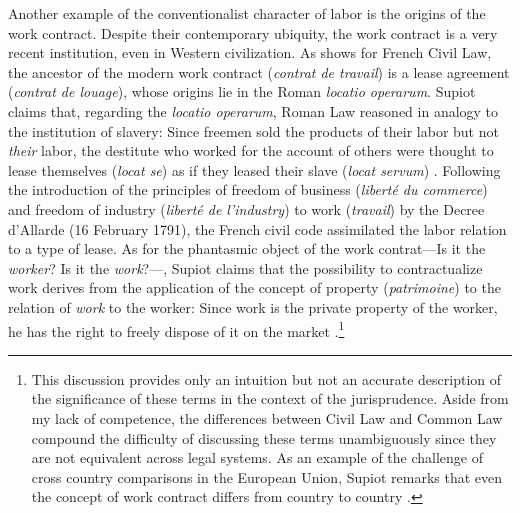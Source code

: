 \documentclass[version=last,draft=false,paper=A4,portrait,twoside=true,twocolumn=false,headinclude=false,footinclude=false,mpinclude=true,fontsize=12,BCOR=20mm,DIV=calc,pagesize=auto,open=right,chapterprefix=true,numbers=autoendperiod,headsepline=false,headings=twolinechapter,parskip=false]{scrbook}
\begin{document}
Another example of the conventionalist character of labor is the origins of
the work contract. Despite their contemporary ubiquity, the work contract
is a very recent institution, even in Western civilization. As
\textcite{supiot2004_2016} shows for French Civil Law, the ancestor of the
modern work contract (\emph{contrat de travail}) is a lease agreement (\emph{contrat de
louage}), whose origins lie in the Roman \emph{locatio operarum}. Supiot claims
that, regarding the \emph{locatio operarum}, Roman Law reasoned in analogy to the
institution of slavery: Since freemen sold the products of their labor but
not \emph{their} labor, the destitute who worked for the account of others were
thought to lease themselves (\emph{locat se}) as if they leased their slave (\emph{locat
servum}) \autocite[p. 8]{supiot2004_2016}. Following the introduction of
the principles of freedom of business (\emph{liberté du commerce}) and freedom of
industry (\emph{liberté de l'industry}) to work (\emph{travail}) by the Decree d'Allarde
(16 February 1791), the French civil code assimilated the labor relation to
a type of lease. As for the phantasmic object of the work contrat---Is it
the \emph{worker}? Is it the \emph{work}?---, Supiot claims that the possibility to
contractualize work derives from the application of the concept of property
(\emph{patrimoine}) to the relation of \emph{work} to the worker: Since work is the
private property of the worker, he has the right to freely dispose of it on
the market \autocite[pp. 45--66]{supiot1994_2011}.\footnote{This discussion provides only an intuition but not an accurate
description of the significance of these terms in the context of the
jurisprudence. Aside from my lack of competence, the differences between
Civil Law and Common Law compound the difficulty of discussing these terms
unambiguously since they are not equivalent across legal systems. As an
example of the challenge of cross country comparisons in the European
Union, Supiot remarks that even the concept of work contract differs from
country to country \autocite{supiot_et_al1999_2016}.}
\end{document}
